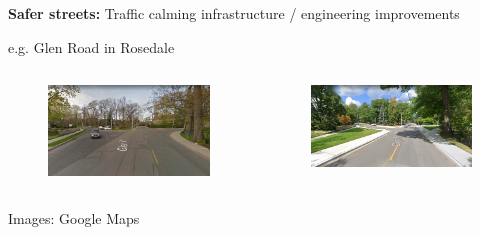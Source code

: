 \documentclass[aspectratio=169]{beamer}
\begin{document}
\begin{frame}
	
	\textbf{Safer streets:} Traffic calming infrastructure / engineering improvements
	
	\vspace{2mm}
	
	e.g. Glen Road in Rosedale
	
		\begin{columns}
		\begin{column}{0.5\textwidth}
			\begin{figure}
				\centering
				\includegraphics[width=1.1\linewidth]{images/glen_2016.png}
			\end{figure}
			
			
		\end{column}
		
		\begin{column}{0.5\textwidth}
			\begin{figure}
				\centering
				\includegraphics[width=1.2\linewidth]{images/glen_2021.png}
			\end{figure}
			
		\end{column}
		
		
		
	\end{columns}

	\tiny{Images: Google Maps}
	
	
\end{frame}
\end{document}
